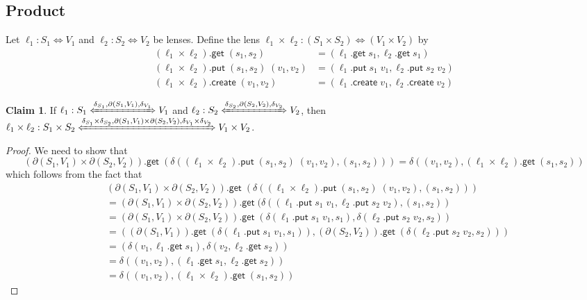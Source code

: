 \documentclass[acmsmall,review,anonymous]{acmart}\settopmatter{printfolios=true,printccs=false,printacmref=false}
\theoremstyle{definition}
\newtheorem{claim}{Claim}
\newcommand{\kw}[1]{\ensuremath{\mathsf{#1}}\xspace}
\newcommand{\get}{\ensuremath{\kw{get}}\xspace}
\newcommand{\pput}{\ensuremath{\kw{put}}\xspace}
\newcommand{\create}{\ensuremath{\kw{create}}\xspace}
\begin{document}
\subsection{Product}
Let $\ell_1 : S_1 \Leftrightarrow V_1$ and $\ell_2 : S_2 \Leftrightarrow V_2$ be
lenses. Define the lens $\ell_1 \times \ell_2 : (S_1 \times S_2) \Leftrightarrow
(V_1 \times V_2)$ by
\begin{align*}
(\ell_1 \times \ell_2).\get \; (s_1, s_2) &= (\ell_1.\get \; s_1, \ell_2.\get
\; s_1)\\
(\ell_1 \times \ell_2).\pput \; (s_1, s_2) \; (v_1, v_2) &= (\ell_1.\pput \; s_1
\; v_1, \ell_2.\pput \; s_2 \; v_2)\\
(\ell_1 \times \ell_2).\create \; (v_1, v_2) &= (\ell_1.\create \; v_1,
\ell_2.\create \; v_2)
\end{align*}
\begin{claim}\label{productislens}
If $\ell_1 :S_1 \xLeftrightarrow{\delta_{S_1}, \partial (S_1, V_1),
\delta_{V_1}} V_1$ and $\ell_2 : S_2 \xLeftrightarrow{\delta_{S_2}, \partial
(S_2, V_2), \delta_{V_2}} V_2$, then \\
$\ell_1 \times \ell_2  : S_1 \times S_2 
\xLeftrightarrow{\delta_{S_1} \times \delta_{S_2}, \partial (S_1, V_1) \times
\partial (S_2, V_2), \delta_{V_1} \times \delta_{V_2}} V_1 \times V_2$.
\end{claim}
\begin{proof}
We need to show that
$$(\partial (S_1, V_1) \times \partial (S_2, V_2)).\get \; (\delta((\ell_1 \times
\ell_2).\pput \; (s_1, s_2) \; (v_1, v_2), (s_1, s_2))) = \delta((v_1, v_2),
(\ell_1 \times \ell_2).\get \; (s_1, s_2))$$ which follows from the fact that
\begin{align*}
&(\partial (S_1, V_1) \times \partial (S_2, V_2)).\get \; (\delta((\ell_1 \times
\ell_2).\pput \; (s_1, s_2) \; (v_1, v_2), (s_1, s_2)))\\
&= (\partial (S_1, V_1) \times \partial (S_2, V_2)).\get \;
(\delta((\ell_1.\pput \; s_1 \; v_1, \ell_2.\pput \; s_2 \; v_2), (s_1, s_2))\\
&= (\partial (S_1, V_1) \times \partial (S_2, V_2)).\get \;
(\delta(\ell_1.\pput \; s_1 \; v_1, s_1), \delta(\ell_2.\pput \; s_2 \; v_2,
s_2))\\
&= ((\partial (S_1, V_1)).\get \; (\delta(\ell_1.\pput \;
s_1 \; v_1, s_1)), (\partial (S_2, V_2)).\get \; (\delta(\ell_2.\pput \; s_2 \;
v_2, s_2)))\\
&= (\delta(v_1, \ell_1.\get \; s_1), \delta(v_2, \ell_2.\get \; s_2))\\
&= \delta((v_1, v_2), (\ell_1.\get \; s_1, \ell_2.\get \; s_2))\\
&= \delta((v_1, v_2), (\ell_1 \times \ell_2).\get \; (s_1, s_2))
\end{align*}
\end{proof}
\end{document}

